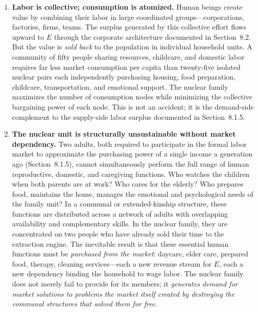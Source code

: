 \documentclass[12pt,openany]{book}
\begin{document}
\begin{enumerate}
    \item \textbf{Labor is collective; consumption is atomized.} Human beings create value by combining their labor in large coordinated groups---corporations, factories, firms, teams. The surplus generated by this collective effort flows upward to $E$ through the corporate architecture documented in Section~8.2. But the value is \textit{sold back} to the population in individual household units. A community of fifty people sharing resources, childcare, and domestic labor requires far less market consumption per capita than twenty-five isolated nuclear pairs each independently purchasing housing, food preparation, childcare, transportation, and emotional support. The nuclear family maximizes the number of consumption nodes while minimizing the collective bargaining power of each node. This is not an accident; it is the demand-side complement to the supply-side labor surplus documented in Section~8.1.5.

    \item \textbf{The nuclear unit is structurally unsustainable without market dependency.} Two adults, both required to participate in the formal labor market to approximate the purchasing power of a single income a generation ago (Section~8.1.5), cannot simultaneously perform the full range of human reproductive, domestic, and caregiving functions. Who watches the children when both parents are at work? Who cares for the elderly? Who prepares food, maintains the home, manages the emotional and psychological needs of the family unit? In a communal or extended-kinship structure, these functions are distributed across a network of adults with overlapping availability and complementary skills. In the nuclear family, they are concentrated on two people who have already sold their time to the extraction engine. The inevitable result is that these essential human functions must be \textit{purchased from the market}: daycare, elder care, prepared food, therapy, cleaning services---each a new revenue stream for $E$, each a new dependency binding the household to wage labor. The nuclear family does not merely fail to provide for its members; it \textit{generates demand for market solutions to problems the market itself created by destroying the communal structures that solved them for free}.


\end{enumerate}
\end{document}
